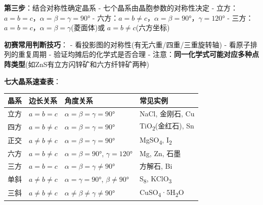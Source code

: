 \textbf{第三步}：结合对称性确定晶系
- 七个晶系由晶胞参数的对称性决定
- 立方：\(a=b=c\)，\(\alpha=\beta=\gamma=90°\)
- 六方：\(a=b \neq c\)，\(\alpha=\beta=90°\)，\(\gamma=120°\)
- 三方：\(a=b=c\)，\(\alpha=\beta=\gamma\)(菱面体)或 \(a=b \neq c\)(六方坐标)

\textbf{初赛常用判断技巧}：
- 看投影图的对称性(有无六重/四重/三重旋转轴)
- 看原子排列的重复周期
- 验证均摊后的化学式是否合理
- 注意：\textbf{同一化学式可能对应多种点阵类型}(如ZnS有立方闪锌矿和六方纤锌矿两种)

\textbf{七大晶系速查表}：

{\def\LTcaptype{none} %
\begin{longtable}[]{@{}
  >{\raggedright\arraybackslash}p{}
  >{\raggedright\arraybackslash}p{}
  >{\raggedright\arraybackslash}p{}
  >{\raggedright\arraybackslash}p{}@{}}
\toprule\noalign{}
\begin{minipage}[b]{\linewidth}\raggedright
晶系
\end{minipage} & \begin{minipage}[b]{\linewidth}\raggedright
边长关系
\end{minipage} & \begin{minipage}[b]{\linewidth}\raggedright
角度关系
\end{minipage} & \begin{minipage}[b]{\linewidth}\raggedright
常见实例
\end{minipage} \\
\midrule\noalign{}
\endhead
\bottomrule\noalign{}
\endlastfoot
立方 & \(a=b=c\) & \(\alpha=\beta=\gamma=90°\) & NaCl, 金刚石, Cu \\
四方 & \(a=b \neq c\) & \(\alpha=\beta=\gamma=90°\) & TiO\textsubscript{2}(金红石), Sn \\
正交 & \(a \neq b \neq c\) & \(\alpha=\beta=\gamma=90°\) & MgSO\textsubscript{4}, I\textsubscript{2} \\
六方 & \(a=b \neq c\) & \(\alpha=\beta=90°\), \(\gamma=120°\) & Mg, Zn, 石墨 \\
三方 & \(a=b=c\) & \(\alpha=\beta=\gamma \neq 90°\) & 方解石, Bi \\
单斜 & \(a \neq b \neq c\) & \(\alpha=\gamma=90°\), \(\beta \neq 90°\) & S\textsubscript{8}, KClO\textsubscript{3} \\
三斜 & \(a \neq b \neq c\) & \(\alpha \neq \beta \neq \gamma \neq 90°\) & CuSO\textsubscript{4}·5H\textsubscript{2}O \\
\end{longtable}
}

